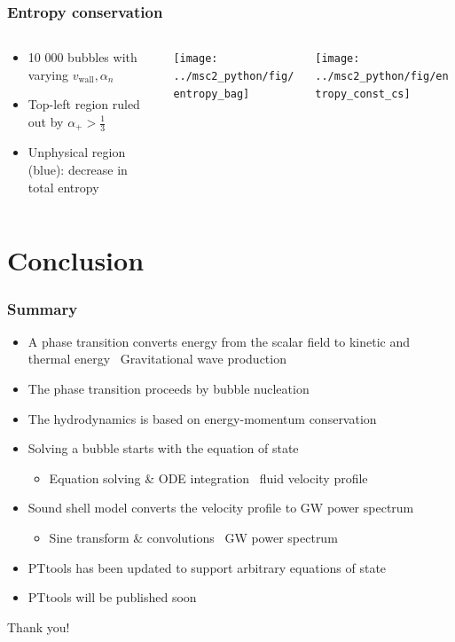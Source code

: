 \begin{frame}
    \frametitle{Entropy conservation}
    \begin{columns}
    \begin{column}{0.3\textwidth}
        \begin{itemize}
            \item 10 000 bubbles with varying $v_\text{wall}, \alpha_n$
            \item Top-left region ruled out by $\alpha_+ > \frac{1}{3}$
            \item Unphysical region (blue): decrease in total entropy
        \end{itemize}%
    \end{column}
    \begin{column}{0.35\textwidth}
        \texttt{[image: ../msc2\_python/fig/entropy\_bag]}
    \end{column}
    \begin{column}{0.35\textwidth}
        \texttt{[image: ../msc2\_python/fig/entropy\_const\_cs]}
    \end{column}
    \end{columns}
\end{frame}

\section{Conclusion}

\begin{frame}
    \frametitle{Summary}
    \begin{itemize}
        \item A phase transition converts energy from the scalar field to kinetic and thermal energy
            \textrightarrow \ Gravitational wave production
        \item The phase transition proceeds by bubble nucleation
        \item The hydrodynamics is based on energy-momentum conservation
        \item Solving a bubble starts with the equation of state
        \begin{itemize}
            \item Equation solving \& ODE integration \textrightarrow \ fluid velocity profile
        \end{itemize}
        \item Sound shell model converts the velocity profile to GW power spectrum
        \begin{itemize}
            \item Sine transform \& convolutions \textrightarrow \ GW power spectrum
        \end{itemize}
        \item PTtools has been updated to support arbitrary equations of state
        \item PTtools will be published soon
    \end{itemize}
    Thank you!
\end{frame}

